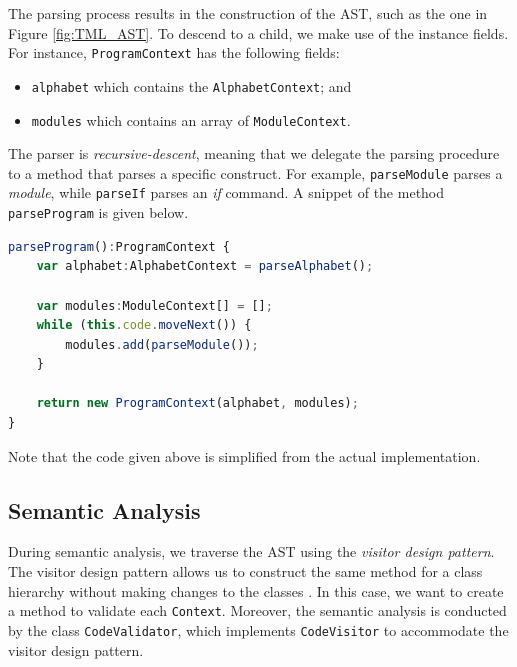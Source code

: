 The parsing process results in the construction of the AST, such as the one in Figure \ref{fig:TML_AST}. To descend to a child, we make use of the instance fields. For instance, \texttt{ProgramContext} has the following fields:
\begin{itemize}
    \item \texttt{alphabet} which contains the \texttt{AlphabetContext}; and
    \item \texttt{modules} which contains an array of \texttt{ModuleContext}.
\end{itemize}

The parser is \emph{recursive-descent}, meaning that we delegate the parsing procedure to a method that parses a specific construct. For example, \texttt{parseModule} parses a \textit{module}, while \texttt{parseIf} parses an \textit{if} command. A snippet of the method \texttt{parseProgram} is given below.
\begin{lstlisting}[language=TypeScript]
parseProgram():ProgramContext {
    var alphabet:AlphabetContext = parseAlphabet();
    
    var modules:ModuleContext[] = [];
    while (this.code.moveNext()) {
        modules.add(parseModule());
    }
    
    return new ProgramContext(alphabet, modules);
}
\end{lstlisting}
Note that the code given above is simplified from the actual implementation.

\subsection{Semantic Analysis}
During semantic analysis, we traverse the AST using the \emph{visitor design pattern}. The visitor design pattern allows us to construct the same method for a class hierarchy without making changes to the classes \citep{gamma1995design}. In this case, we want to create a method to validate each \texttt{Context}. Moreover, the semantic analysis is conducted by the class \texttt{CodeValidator}, which implements \texttt{CodeVisitor} to accommodate the visitor design pattern.

